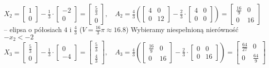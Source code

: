 \documentclass[licencjacka]{pracamgr}
\begin{document}
$X_2=\left[\begin{array}{c}1\\0\end{array}\right]-\frac{1}{3}\cdot\left[\begin{array}{c}-2\\0\end{array}\right]=\left[\begin{array}{c}\frac{5}{3}\\0\end{array}\right],\quad
A_2=\frac{4}{3}\left(\left[\begin{array}{cc}4&0\\0&12\end{array}\right]-\frac{2}{3}\cdot\left[\begin{array}{cc}4&0\\0&0\end{array}\right] \right)=
\left[\begin{array}{cc}\frac{16}{9}&0\\0&16\end{array}\right]$\newline\newline
-- elipsa o półosiach $4$ i $\frac{4}{3}$ ($V=\frac{16}{3}\pi\approx16.8$)\newline
%
Wybieramy niespełnioną nierówność $-x_2<-2$\newline\newline
$X_3=\left[\begin{array}{c}\frac{5}{3}\\0\end{array}\right]-\frac{1}{3}\cdot\left[\begin{array}{c}0\\-4\end{array}\right]=\left[\begin{array}{c}\frac{5}{3}\\\frac{4}{3}\end{array}\right],\quad
A_3=\frac{4}{3}\left(\left[\begin{array}{cc}\frac{16}{9}&0\\0&16\end{array}\right]-\frac{2}{3}\cdot\left[\begin{array}{cc}0&0\\0&16\end{array}\right] \right)=
\left[\begin{array}{cc}\frac{64}{27}&0\\0&\frac{64}{9}\end{array}\right]$\newline\newline
\end{document}

